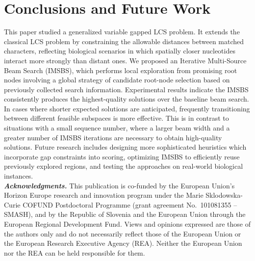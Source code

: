 \documentclass[runningheads]{llncs}
\begin{document}

\section{Conclusions and Future Work}
\label{sec: conclusions}

This paper studied a generalized variable gapped LCS problem. It extends the classical LCS problem by constraining the allowable distances between matched characters, reflecting biological scenarios in which spatially closer nucleotides interact more strongly than distant ones.  
We proposed an Iterative Multi-Source Beam Search (IMSBS), which performs local exploration from promising root nodes involving a global strategy of candidate root-node selection based on previously collected search information. Experimental results indicate the IMSBS consistently produces the highest-quality solutions over the baseline beam search. In cases where shorter expected solutions are anticipated, frequently transitioning between different feasible subspaces is more effective. This is in contrast to situations with a small sequence number, where a larger beam width and a greater number of IMSBS iterations are necessary to obtain high-quality solutions.  %
 Future research includes designing more sophisticated heuristics which incorporate gap constraints into scoring, optimizing IMSBS to efficiently reuse previously explored regions, %
 and testing the approaches on real-world biological instances. %
 \\
 \textit{\textbf{Acknowledgments.}} This publication is co-funded by the European Union’s Horizon Europe research and innovation program under the Marie Sklodowska-Curie COFUND Postdoctoral Programme (grant agreement No.~101081355 -- SMASH), and by the Republic of Slovenia and the European Union through the European Regional Development Fund. Views and opinions expressed are those of the authors only and do not necessarily reflect those of the European Union or the European Research Executive Agency (REA). Neither the European Union nor the REA can be held responsible for them.
\end{document}
